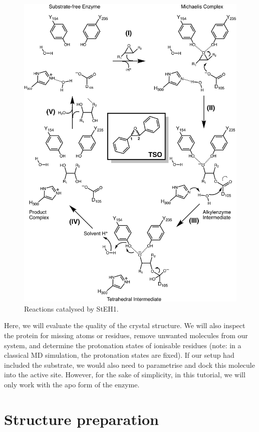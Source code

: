 \documentclass[10pt]{article}
\begin{document}
\begin{figure}[H]
 \centering
 \includegraphics[scale=0.3]{./img/rxns}
 \caption{Reactions catalysed by StEH1.}
\end{figure}

Here, we will evaluate the quality of the crystal structure. We will also inspect the protein for missing atoms or residues, remove unwanted molecules from our system, and determine the protonation states of ionisable residues (note: in a classical MD simulation, the protonation states are fixed). If our setup had included the substrate, we would also need to parametrise and dock this molecule into the active site. However, for the sake of simplicity, in this tutorial, we will only work with the apo form of the enzyme. 

\section{Structure preparation}
\end{document}
